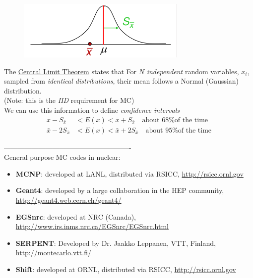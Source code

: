 \documentclass[12pt]{article}
\begin{document}
\begin{figure}[h!]
\begin{center}
  \includegraphics[height=1 in,clip]{../figs/gaussian}
\end{center}
  \label{fig:gaussian}
\end{figure}
%
The \underline{Central Limit Theorem} states that
For $N$ \textit{independent} random variables, $x_i$, sampled from \textit{identical distributions}, their mean follows a Normal (Gaussian) distribution.\\
(Note: this is the \textit{IID} requirement for MC)\\
We can use this information to define \textit{confidence intervals}
\begin{align*}
\bar{x} - S_{\bar{x}} &< E(x) < \bar{x} + S_{\bar{x}} \quad \text{about 68\% of the time}\\
\bar{x} - 2S_{\bar{x}} &< E(x) < \bar{x} + 2S_{\bar{x}} \quad \text{about 95\% of the time}
\end{align*}





-------------------------------------------------------\\
General purpose MC codes in nuclear:
\begin{itemize}
\item \textbf{MCNP}: developed at LANL, distributed via RSICC, \href{http://rsicc.ornl.gov}{http://rsicc.ornl.gov}
\item \textbf{Geant4}: developed by a large collaboration in the HEP community, \href{ http://geant4.web.cern.ch/geant4/}{http://geant4.web.cern.ch/geant4/}
\item \textbf{EGSnrc}: developed at NRC (Canada), \href{http://www.irs.inms.nrc.ca/EGSnrc/EGSnrc.html}{http://www.irs.inms.nrc.ca/EGSnrc/EGSnrc.html}
\item \textbf{SERPENT}: Developed by Dr. Jaakko Leppanen, VTT, Finland, \href{ http://montecarlo.vtt.fi/}{http://montecarlo.vtt.fi/}
\item \textbf{Shift}: developed at ORNL, distributed via RSICC, \href{http://rsicc.ornl.gov}{http://rsicc.ornl.gov}
\end{itemize}
\end{document}
